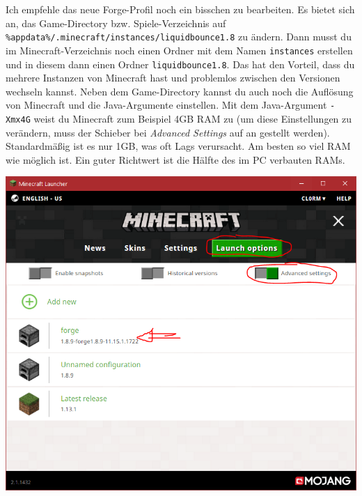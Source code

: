 Ich empfehle das neue Forge-Profil noch ein bisschen zu bearbeiten. Es bietet sich an, das Game-Directory bzw. Spiele-Verzeichnis auf \texttt{\%appdata\%/.minecraft/instances/liquidbounce1.8} zu ändern. Dann musst du im Minecraft-Verzeichnis noch einen Ordner mit dem Namen \texttt{instances} erstellen und in diesem dann einen Ordner \texttt{liquidbounce1.8}. Das hat den Vorteil, dass du mehrere Instanzen von Minecraft hast und problemlos zwischen den Versionen wechseln kannst.
Neben dem Game-Directory kannst du auch noch die Auflösung von Minecraft und die Java-Argumente einstellen. Mit dem Java-Argument \texttt{-Xmx4G} weist du Minecraft zum Beispiel 4GB RAM zu (um diese Einstellungen zu verändern, muss der Schieber bei \textit{Advanced Settings} auf an gestellt werden). Standardmäßig ist es nur 1GB, was oft Lags verursacht. Am besten so viel RAM wie möglich ist. Ein guter Richtwert ist die Hälfte des im PC verbauten RAMs.

\includegraphics[scale=0.4, center]{TeX_files/pics/installation_1.png}

